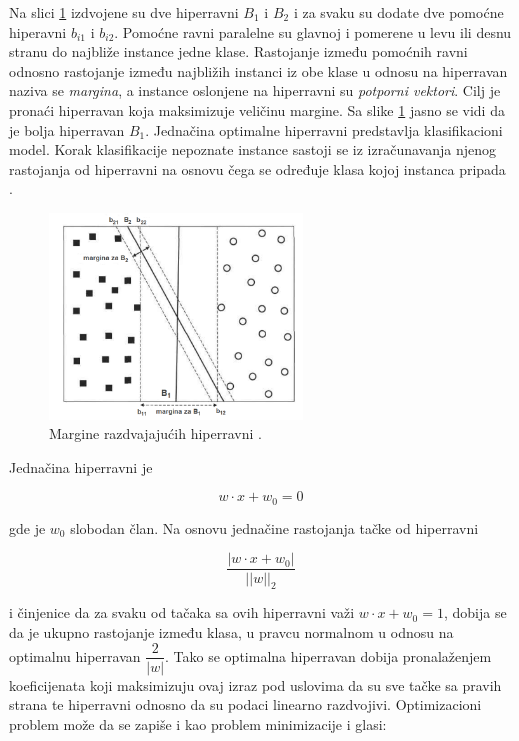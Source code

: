 Na slici \ref{fig:svm2} izdvojene su dve hiperravni $B_1$ i $B_2$ i za svaku su dodate dve pomoćne hiperavni $b_{i1}$ i $b_{i2}$. Pomoćne ravni paralelne su glavnoj i pomerene u levu ili desnu stranu do najbliže instance jedne klase. Rastojanje između pomoćnih ravni odnosno rastojanje između najbližih instanci iz obe klase u odnosu na hiperravan naziva se \textit{margina}, a  instance oslonjene na hiperravni su \textit{potporni vektori}. Cilj je pronaći hiperravan koja maksimizuje veličinu margine. Sa slike \ref{fig:svm2} jasno se vidi da je bolja hiperravan $B_1$. Jednačina optimalne hiperravni predstavlja klasifikacioni model. Korak klasifikacije nepoznate instance sastoji se iz izračunavanja njenog rastojanja od hiperravni na osnovu čega se određuje klasa kojoj instanca pripada \cite{introDM, doktJG}.



\begin{figure}[h]
	\centering
	\includegraphics[width=0.6\textwidth]{Figures/svm2.png}
	\caption{Margine razdvajajućih hiperravni \cite{introDM}.}
	\label{fig:svm2}
\end{figure}


Jednačina hiperravni je

$$w \cdot x + w_0 = 0$$

\noindent gde je $w_0$ slobodan član. Na osnovu jednačine rastojanja tačke od hiperravni

$$\dfrac{|w \cdot x + w_0|}{||w||_2}$$

\noindent i činjenice da za svaku od tačaka sa ovih hiperravni važi $w \cdot x + w_0 = 1$, dobija se da je ukupno rastojanje između klasa, u pravcu normalnom u odnosu na optimalnu hiperravan $\dfrac{2}{|w|}$. Tako se optimalna hiperravan dobija pronalaženjem koeficijenata koji maksimizuju ovaj izraz pod uslovima da su sve tačke sa pravih strana te hiperravni odnosno da su podaci linearno razdvojivi. Optimizacioni problem može da se zapiše i kao problem minimizacije i glasi:

